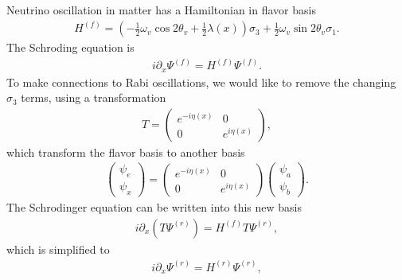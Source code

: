 \documentclass[letterpaper,12pt,english]{sphinxmanual}
\begin{document}
Neutrino oscillation in matter has a Hamiltonian in flavor basis
\begin{equation*}
\begin{split}H^{(f)} = \left(- \frac{1}{2} \omega_v \cos 2\theta_v +\frac{1}{2}\lambda(x)  \right)\sigma_3 + \frac{1}{2} \omega_v \sin 2\theta_v \sigma_1.\end{split}
\end{equation*}
The Schroding equation is
\begin{equation*}
\begin{split}i \partial_x \Psi^{(f)} = H^{(f)} \Psi^{(f)}.\end{split}
\end{equation*}
To make connections to Rabi oscillations, we would like to remove the changing \(\sigma_3\) terms, using a transformation
\begin{equation*}
\begin{split}T = \begin{pmatrix} e^{-i \eta (x)} & 0 \\  0 & e^{i \eta (x)}  \end{pmatrix},\end{split}
\end{equation*}
which transform the flavor basis to another basis
\begin{equation*}
\begin{split}\begin{pmatrix} \psi_e \\ \psi_x \end{pmatrix} = \begin{pmatrix} e^{-i \eta (x)} & 0 \\  0 & e^{i \eta (x)}  \end{pmatrix} \begin{pmatrix} \psi_{a} \\ \psi_{b} \end{pmatrix}.\end{split}
\end{equation*}
The Schrodinger equation can be written into this new basis
\begin{equation*}
\begin{split}i \partial_x (T \Psi^{(r)}) = H^{(f)} T\Psi^{(r)},\end{split}
\end{equation*}
which is simplified to
\begin{equation*}
\begin{split}i \partial_x \Psi^{(r)} = H^{(r)} \Psi^{(r)},\end{split}
\end{equation*}
\end{document}
